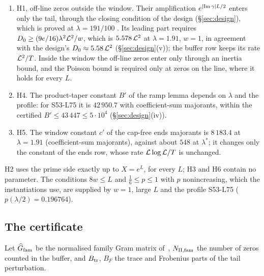 \begin{enumerate}[label=(\arabic*)]
\item H1, off-line zeros outside the window. Their amplification $e^{\lvert \operatorname{Im}\gamma\rvert L/2}$ enters only the tail, through the closing condition of the design
(\S\ref{sec:design}), which is proved at $\lambda=191/100$ \tagL. Its leading part requires $D_0\ge(9e/16)\lambda^2\mathcal L^2/w$, which is $5.578\,\mathcal L^2$ at $\lambda=1.91$,
$w=1$, in agreement with the design's $D_0\approx5.58\,\mathcal L^2$ (\S\ref{sec:design}(v)); the buffer row keeps its rate $\mathcal L^2/T$. Inside the window the off-line
zeros enter only through an inertia bound, and the Poisson bound is required only at zeros on the line, where it holds for every $L$.
\item H4. The product-taper constant $B'$ of the ramp lemma depends on $\lambda$ and the profile: for S53-L75 it is $42\,950.7$ with coefficient-sum majorants,
within the certified $B'\le43\,447\le5\cdot10^4$ (\S\ref{sec:design}(iv)).
\item H5. The window constant $c'$ of the cap-free ends majorants is $8\,183.4$ at $\lambda=1.91$ (coefficient-sum majorants), against about $548$ at $\lambda^*$; it
changes only the constant of the ends row, whose rate $\mathcal L\log\mathcal L/T$ is unchanged.
\end{enumerate}
H2 uses the prime side exactly up to $X=e^L$, for every $L$; H3 and H6 contain no parameter. The conditions $8w\le L$ and $\frac16\le p\le1$ with $p$
nonincreasing, which the instantiations use, are supplied by $w=1$, large $L$ and the profile S53-L75 ($p(\lambda/2)=0.196764$).

\subsection{The certificate}\label{ssec:cert-prop}
Let $\widehat G_{\rm fam}$ be the normalised family Gram matrix of~\cite[\S3]{DSouza}, $N_{\rm II,fam}$ the number of zeros counted
in the buffer, and $B_{\rm tr}$, $B_F$ the trace and Frobenius parts of the tail perturbation.

